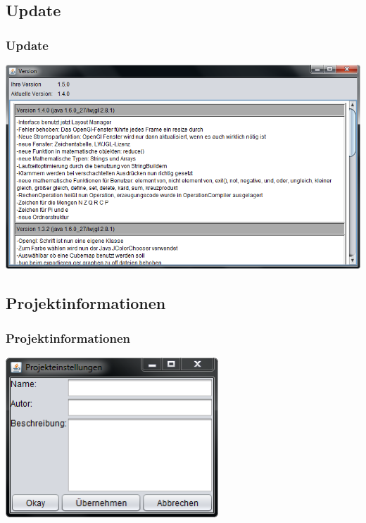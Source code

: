\documentclass{beamer}
\begin{document}
\subsection{Update} 
\begin{frame}\frametitle{Update}
\includegraphics[width=1.0\textwidth]{images/program/update-window.png}
\end{frame}

\subsection{Projektinformationen}
\begin{frame}\frametitle{Projektinformationen}
 \includegraphics[width=0.6\textwidth]{images/program/project-information-window.png}
\end{frame}
\end{document}
